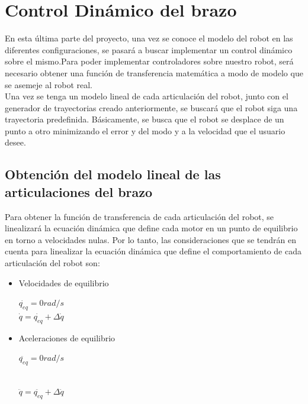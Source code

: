 \section{Control Dinámico del brazo}
En esta última parte del proyecto, una vez se conoce el modelo del robot en las diferentes configuraciones, se pasará a buscar implementar un control dinámico sobre el mismo.Para poder implementar controladores sobre nuestro robot, será necesario obtener una función de transferencia matemática a modo de modelo que se asemeje al robot real.\\

Una vez se tenga un modelo lineal de cada articulación del robot, junto con el generador de trayectorias creado anteriormente, se buscará que el robot siga una trayectoria predefinida. Básicamente, se busca que el robot se desplace de un punto a otro minimizando el error y del modo y a la velocidad que el usuario desee.\\



\subsection{Obtención del modelo lineal de las articulaciones del brazo}

Para obtener la función de transferencia de cada articulación del robot, se linealizará la ecuación dinámica que define cada motor en un punto de equilibrio en torno a velocidades nulas. Por lo tanto, las consideraciones que se tendrán en cuenta para linealizar la ecuación dinámica que define el comportamiento de cada articulación del robot son:

\begin{itemize}
	
	\item Velocidades de equilibrio
	
	\begin{center}
		
		$ \dot{q_{eq}}=0 rad/s $\\
		
		$ \dot{q} =\dot{q_{eq}}+\Delta\dot{q}$
		
	\end{center}
	
	\item Aceleraciones de equilibrio
	
	\begin{center}
		
		$ \ddot{q_{eq}}=0 rad/s $\\
		
		$  $
		
		$ \ddot{q} =\ddot{q_{eq}}+\Delta\ddot{q}$
		
	\end{center}
	
\end{itemize}



